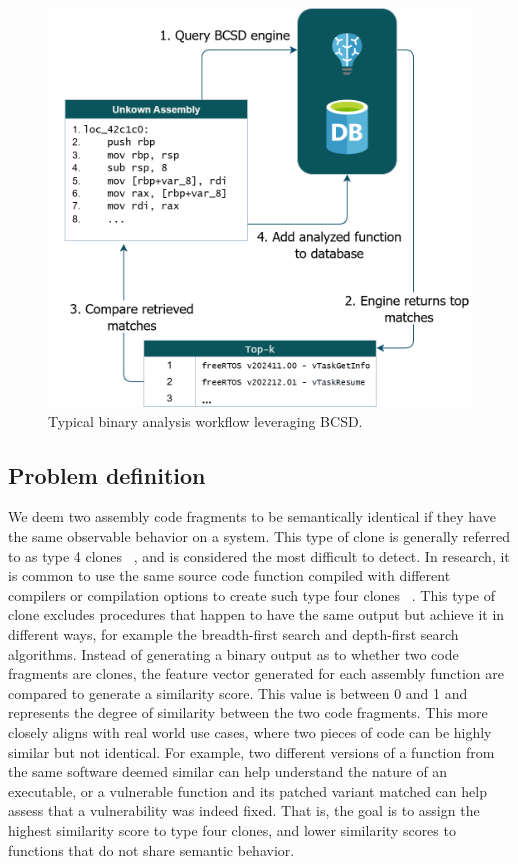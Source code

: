 \begin{figure}[t]
\centerline{\includegraphics[width=\linewidth]{BCSD-schematic}}
\caption{Typical binary analysis workflow leveraging BCSD.}
\label{BCSD-workflow}
\end{figure}

\subsection{Problem definition}

We deem two assembly code fragments to be semantically identical if they have the same observable behavior on a system.
This type of clone is generally referred to as type 4 clones ~\cite{Asm2Vec,BinClone}, and is considered the most difficult
to detect. In research, it is common to use the same source code function compiled with different compilers or compilation
options to create such type four clones ~\cite{SAFE,PalmTree,OrderMatters,Asm2Vec,CLAP}.  This type of clone excludes
procedures that happen to have the same output but achieve it in different ways, for example the breadth-first search and
depth-first search algorithms. Instead of generating a binary output as to whether two code fragments are clones, the feature
vector generated for each assembly function are compared to generate a similarity score. This value is between 0 and 1 and
represents the degree of similarity between the two code fragments. This more closely aligns with real world use cases, where
two pieces of code can be highly similar but not identical. For example, two different versions of a function from the same
software deemed similar can help understand the nature of an executable, or a vulnerable function and its patched variant matched
can help assess that a vulnerability was indeed fixed. That is, the goal is to assign the highest similarity score to type four
clones, and lower similarity scores to functions that do not share semantic behavior. 

